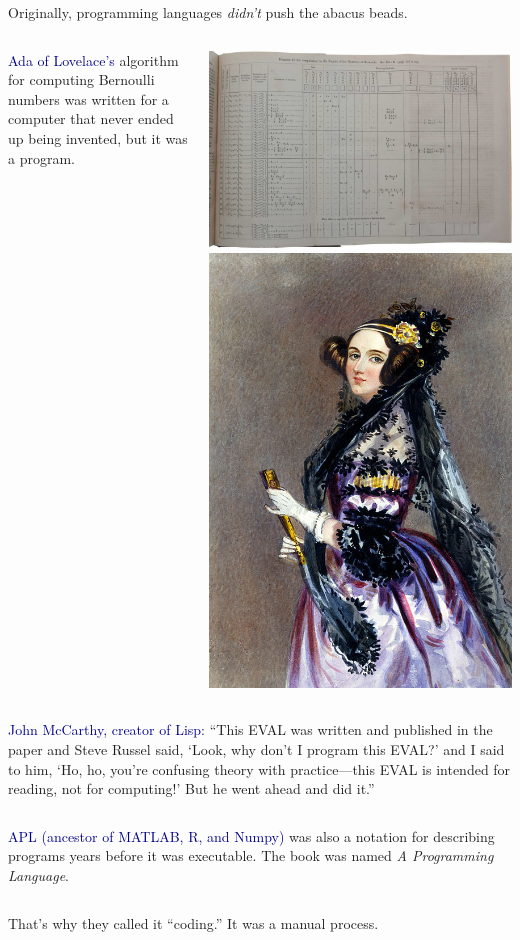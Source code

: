 \documentclass[aspectratio=169]{beamer}
\begin{document}
\begin{frame}{Originally, programming languages {\it didn't} push the abacus beads.}
\vspace{0.25 cm}
\begin{columns}
\textcolor{darkblue}{Ada of Lovelace's} algorithm for computing Bernoulli numbers was written for a computer that never ended up being invented, but it was a program.

\hfill\mbox{\hspace{-1 cm}\includegraphics[height=3 cm]{ada-program.jpg}\hspace{0.5 cm}\includegraphics[height=3 cm]{ada.jpg}}
\end{columns}

\vspace{0.5 cm}
\begin{columns}
\textcolor{darkblue}{John McCarthy, creator of Lisp:} ``This EVAL was written and published in the paper and Steve Russel said, `Look, why don't I program this EVAL?' and I said to him, `Ho, ho, you're confusing theory with practice---this EVAL is intended for reading, not for computing!' But he went ahead and did it.''
\end{columns}

\vspace{0.5 cm}
\begin{columns}
\textcolor{darkblue}{APL (ancestor of MATLAB, R, and Numpy)} was also a notation for describing programs years before it was executable. The book was named {\it A Programming Language}.
\end{columns}
\end{frame}

\begin{frame}{}
\Large
\vspace{1.25 cm}
\begin{center}
That's why they called it ``coding.'' It was a manual process.

\vspace{1.5 cm}
\end{center}
\end{frame}
\end{document}
